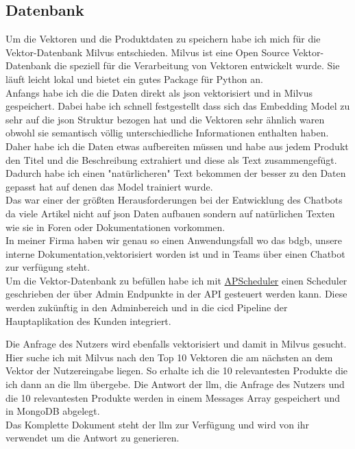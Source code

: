 \subsection{Datenbank}\label{sec:umsetzung_db}
Um die Vektoren und die Produktdaten zu speichern habe ich mich für die Vektor-Datenbank Milvus \cite{milvus} entschieden.
Milvus ist eine Open Source Vektor-Datenbank die speziell für die Verarbeitung von Vektoren entwickelt wurde.
Sie läuft leicht lokal und bietet ein gutes Package für Python an.\\
Anfangs habe ich die die Daten direkt als \gls{json} vektorisiert und in Milvus gespeichert. Dabei habe ich schnell festgestellt dass sich das Embedding Model
zu sehr auf die \gls{json} Struktur bezogen hat und die Vektoren sehr ähnlich waren obwohl sie semantisch völlig unterschiedliche Informationen enthalten haben.\\
Daher habe ich die Daten etwas aufbereiten müssen und habe aus jedem Produkt den Titel und die Beschreibung extrahiert und diese als Text zusammengefügt.
Dadurch habe ich einen "natürlicheren" Text bekommen der besser zu den Daten gepasst hat auf denen das Model trainiert wurde.\\
Das war einer der größten Herausforderungen bei der Entwicklung des Chatbots da viele Artikel nicht auf \gls{json} Daten aufbauen sondern auf natürlichen Texten wie sie
in Foren oder Dokumentationen vorkommen.\\
In meiner Firma haben wir genau so einen Anwendungsfall wo das \gls{bdgb}, unsere interne Dokumentation,vektorisiert worden ist und in Teams über einen Chatbot zur verfügung steht.\\
Um die Vektor-Datenbank zu befüllen habe ich mit \href{https://apscheduler.readthedocs.io/en/3.x/}{APScheduler} einen Scheduler geschrieben der über Admin Endpunkte in der API gesteuert werden kann.
Diese werden zukünftig in den Adminbereich und in die \gls{cicd} Pipeline der Hauptaplikation des Kunden integriert.

\pagebreak
Die Anfrage des Nutzers wird ebenfalls vektorisiert und damit in Milvus gesucht. Hier suche ich mit Milvus nach den Top 10 Vektoren die am nächsten an dem Vektor der Nutzereingabe liegen.
So erhalte ich die 10 relevantesten Produkte die ich dann an die \gls{llm} übergebe. Die Antwort der \gls{llm}, die Anfrage des Nutzers und die 10 relevantesten Produkte werden in einem Messages Array
gespeichert und in MongoDB abgelegt.\\
Das Komplette Dokument steht der \gls{llm} zur Verfügung und wird von ihr verwendet um die Antwort zu generieren.\\

